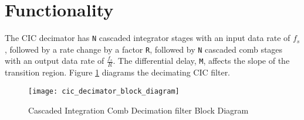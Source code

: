 \section*{Functionality}
\begin{flushleft}
	The CIC decimator has \verb+N+ cascaded integrator stages with an input data rate of $f_{s}$, followed by a rate change by a factor \verb+R+, followed by \verb+N+ cascaded comb stages with an output data rate of $\frac{f_{s}}{R}$. The differential delay, \verb+M+, affects the slope of the transition region. Figure \ref{fig:cic} diagrams the decimating CIC filter.

	\begin{figure}[ht]
		\centering
		\texttt{[image: cic\_decimator\_block\_diagram]}
		\caption{Cascaded Integration Comb Decimation filter Block Diagram}
		\label{fig:cic}
	\end{figure}
\end{flushleft}
